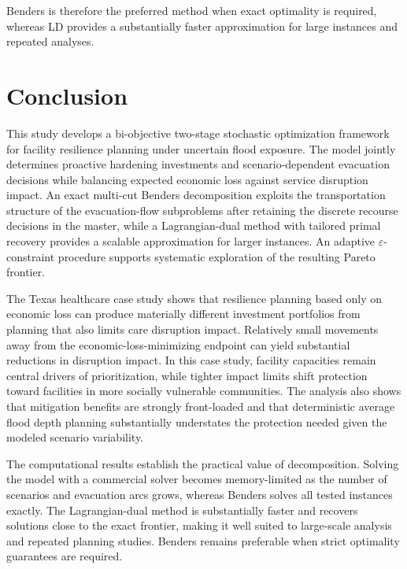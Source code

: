 \documentclass[preprint,11pt,authoryear]{elsarticle}
\begin{document}
Benders is therefore the preferred method when exact optimality is required, whereas LD provides a substantially faster approximation for large instances and repeated analyses.


\section{Conclusion}
\label{sec:conclusion}

This study develops a bi-objective two-stage stochastic optimization framework
for facility resilience planning under uncertain flood exposure. The model
jointly determines proactive hardening investments and scenario-dependent
evacuation decisions while balancing expected economic loss against service disruption impact. An exact multi-cut Benders decomposition exploits the transportation
structure of the evacuation-flow subproblems after retaining the discrete
recourse decisions in the master, while a Lagrangian-dual method with
tailored primal recovery provides a scalable approximation for larger
instances. An adaptive $\varepsilon$-constraint
procedure supports systematic exploration of the resulting Pareto frontier.

The Texas healthcare case study shows that resilience planning based only on
economic loss can produce materially different investment portfolios from
planning that also limits care disruption impact. Relatively small movements away
from the economic-loss-minimizing endpoint can yield substantial reductions in disruption impact. In this case study, facility capacities remain central drivers of
prioritization, while tighter impact limits shift protection toward
facilities in more socially vulnerable communities. The analysis also
shows that mitigation benefits are strongly front-loaded and that
deterministic average flood depth planning substantially understates the protection needed given the modeled scenario variability.

The computational results establish the practical value of decomposition. Solving the model with a commercial solver becomes memory-limited as the number of scenarios
and evacuation arcs grows, whereas Benders solves all tested instances exactly. The Lagrangian-dual method is substantially faster and recovers solutions close to the exact frontier, making it
well suited to large-scale analysis and repeated planning studies.
Benders remains preferable when strict optimality guarantees are required.
\end{document}
